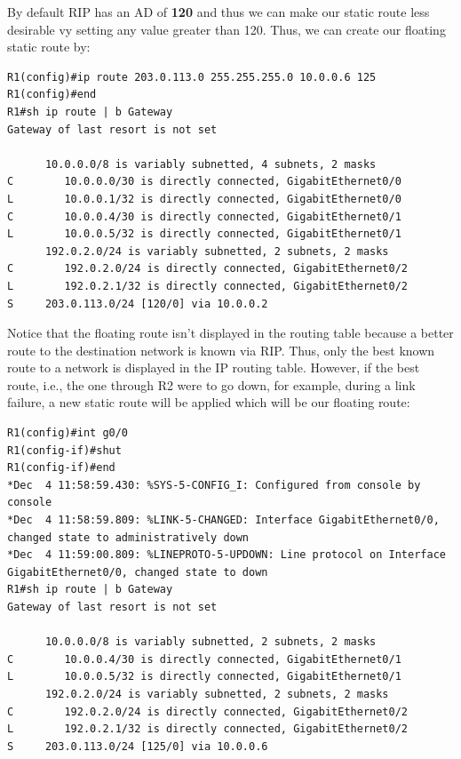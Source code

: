\noindent
By default RIP has an AD of \textbf{120} and thus we can make our static route less desirable vy setting any value greater than 120. Thus, we can create our floating static route by: 

\vspace{-15pt}
\begin{verbatim}
R1(config)#ip route 203.0.113.0 255.255.255.0 10.0.0.6 125
R1(config)#end
R1#sh ip route | b Gateway
Gateway of last resort is not set

      10.0.0.0/8 is variably subnetted, 4 subnets, 2 masks
C        10.0.0.0/30 is directly connected, GigabitEthernet0/0
L        10.0.0.1/32 is directly connected, GigabitEthernet0/0
C        10.0.0.4/30 is directly connected, GigabitEthernet0/1
L        10.0.0.5/32 is directly connected, GigabitEthernet0/1
      192.0.2.0/24 is variably subnetted, 2 subnets, 2 masks
C        192.0.2.0/24 is directly connected, GigabitEthernet0/2
L        192.0.2.1/32 is directly connected, GigabitEthernet0/2
S     203.0.113.0/24 [120/0] via 10.0.0.2
\end{verbatim}
\vspace{-10pt}

\noindent
Notice that the floating route isn't displayed in the routing table because a better route to the destination network is known via RIP. Thus, only the best known route to a network is displayed in the IP routing table. However, if the best route, i.e., the one through R2 were to go down, for example, during a link failure, a new static route will be applied which will be our floating route: 

\vspace{-15pt}
\begin{verbatim}
R1(config)#int g0/0
R1(config-if)#shut
R1(config-if)#end
*Dec  4 11:58:59.430: %SYS-5-CONFIG_I: Configured from console by console
*Dec  4 11:58:59.809: %LINK-5-CHANGED: Interface GigabitEthernet0/0, changed state to administratively down
*Dec  4 11:59:00.809: %LINEPROTO-5-UPDOWN: Line protocol on Interface GigabitEthernet0/0, changed state to down
R1#sh ip route | b Gateway
Gateway of last resort is not set

      10.0.0.0/8 is variably subnetted, 2 subnets, 2 masks
C        10.0.0.4/30 is directly connected, GigabitEthernet0/1
L        10.0.0.5/32 is directly connected, GigabitEthernet0/1
      192.0.2.0/24 is variably subnetted, 2 subnets, 2 masks
C        192.0.2.0/24 is directly connected, GigabitEthernet0/2
L        192.0.2.1/32 is directly connected, GigabitEthernet0/2
S     203.0.113.0/24 [125/0] via 10.0.0.6
\end{verbatim}

